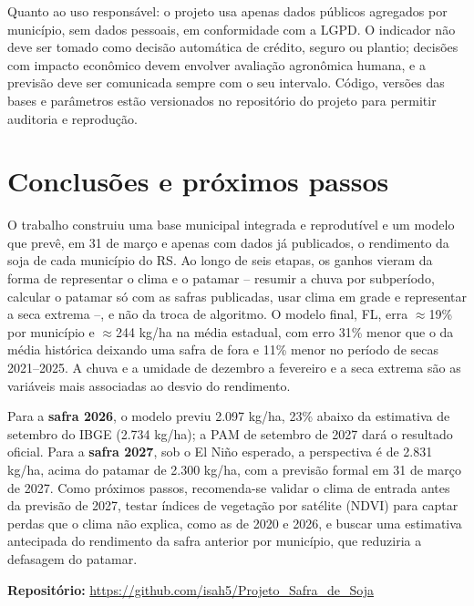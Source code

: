 \documentclass[12pt]{article}
\begin{document}
Quanto ao uso responsável: o projeto usa apenas dados públicos agregados
por município, sem dados pessoais, em conformidade com a LGPD. O
indicador não deve ser tomado como decisão automática de crédito, seguro
ou plantio; decisões com impacto econômico devem envolver avaliação
agronômica humana, e a previsão deve ser comunicada sempre com o seu
intervalo. Código, versões das bases e parâmetros estão versionados no
repositório do projeto para permitir auditoria e reprodução.

\section{Conclusões e próximos passos}

O trabalho construiu uma base municipal integrada e reprodutível e um
modelo que prevê, em 31 de março e apenas com dados já publicados, o
rendimento da soja de cada município do RS. Ao longo de seis etapas, os
ganhos vieram da forma de representar o clima e o patamar -- resumir a
chuva por subperíodo, calcular o patamar só com as safras publicadas, usar
clima em grade e representar a seca extrema --, e não da troca de
algoritmo. O modelo final, FL, erra $\approx$19\% por município e
$\approx$244 kg/ha na média estadual, com erro 31\% menor que o da média
histórica deixando uma safra de fora e 11\% menor no período de secas
2021--2025. A chuva e a umidade de dezembro a fevereiro e a seca extrema
são as variáveis mais associadas ao desvio do rendimento.

Para a \textbf{safra 2026}, o modelo previu 2.097 kg/ha, 23\% abaixo da
estimativa de setembro do IBGE (2.734 kg/ha); a PAM de setembro de 2027
dará o resultado oficial. Para a \textbf{safra 2027}, sob o El Niño
esperado, a perspectiva é de 2.831 kg/ha, acima do patamar de 2.300
kg/ha, com a previsão formal em 31 de março de 2027. Como próximos
passos, recomenda-se validar o clima de entrada antes da previsão de
2027, testar índices de vegetação por satélite (NDVI) para captar perdas
que o clima não explica, como as de 2020 e 2026, e buscar uma estimativa
antecipada do rendimento da safra anterior por município, que reduziria a
defasagem do patamar.

\textbf{Repositório:} \url{https://github.com/isah5/Projeto_Safra_de_Soja}
\end{document}
